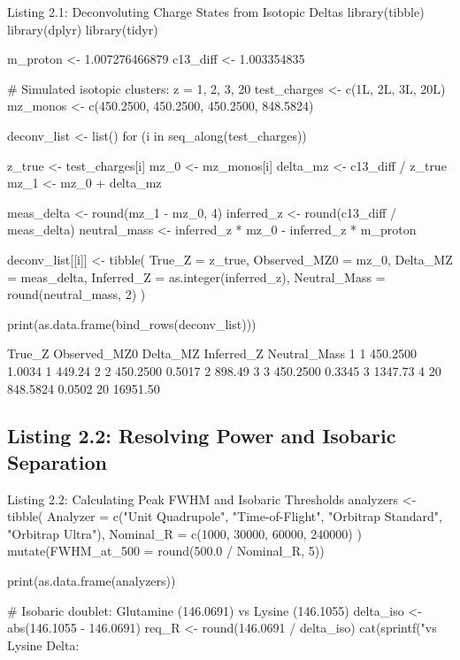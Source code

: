 \documentclass[11pt,twoside,openright]{book}
\begin{document}
\begin{rchunk}{Listing 2.1: Deconvoluting Charge States from Isotopic Deltas}
library(tibble)
library(dplyr)
library(tidyr)

m_proton <- 1.007276466879
c13_diff <- 1.003354835

# Simulated isotopic clusters: z = 1, 2, 3, 20
test_charges <- c(1L, 2L, 3L, 20L)
mz_monos     <- c(450.2500, 450.2500, 450.2500, 848.5824)

deconv_list <- list()
for (i in seq_along(test_charges)) {
  z_true   <- test_charges[i]
  mz_0     <- mz_monos[i]
  delta_mz <- c13_diff / z_true
  mz_1     <- mz_0 + delta_mz
  
  meas_delta    <- round(mz_1 - mz_0, 4)
  inferred_z    <- round(c13_diff / meas_delta)
  neutral_mass  <- inferred_z * mz_0 - inferred_z * m_proton
  
  deconv_list[[i]] <- tibble(
    True_Z       = z_true,
    Observed_MZ0 = mz_0,
    Delta_MZ     = meas_delta,
    Inferred_Z   = as.integer(inferred_z),
    Neutral_Mass = round(neutral_mass, 2)
  )
}

print(as.data.frame(bind_rows(deconv_list)))
\end{rchunk}

\begin{routput}
  True\_Z Observed\_MZ0 Delta\_MZ Inferred\_Z Neutral\_Mass
1      1      450.2500   1.0034          1       449.24
2      2      450.2500   0.5017          2       898.49
3      3      450.2500   0.3345          3      1347.73
4     20      848.5824   0.0502         20     16951.50
\end{routput}

\subsection{Listing 2.2: Resolving Power and Isobaric Separation}

\begin{rchunk}{Listing 2.2: Calculating Peak FWHM and Isobaric Thresholds}
analyzers <- tibble(
  Analyzer  = c("Unit Quadrupole", "Time-of-Flight", "Orbitrap Standard", "Orbitrap Ultra"),
  Nominal_R = c(1000, 30000, 60000, 240000)
) %
  mutate(FWHM_at_500 = round(500.0 / Nominal_R, 5))

print(as.data.frame(analyzers))

# Isobaric doublet: Glutamine (146.0691) vs Lysine (146.1055)
delta_iso <- abs(146.1055 - 146.0691)
req_R     <- round(146.0691 / delta_iso)
cat(sprintf("\nGlutamine vs Lysine Delta: %
\end{rchunk}
\end{document}
